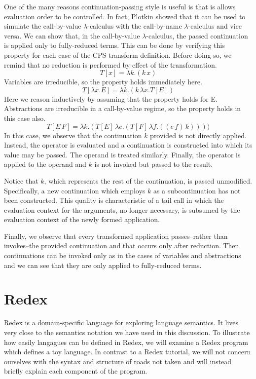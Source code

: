\documentclass[ms,electronic,twosidetoc,letterpaper,chaptercenter,parttop]{byumsphd}
\begin{document}
One of the many reasons continuation-passing style is useful is that is allows evaluation
order to be controlled. In fact, Plotkin \cite{plotkin1975call} showed that it can be used
to simulate the call-by-value $\lambda$-calculus with the call-by-name $\lambda$-calculus
and vice versa. We can show that, in the call-by-value $\lambda$-calculus, the passed
continuation is applied only to fully-reduced terms. This can be done by verifying this
property for each case of the CPS transform definition. Before doing so, we remind that no
reduction is performed by effect of the transformation.
\[
T[x]=\lambda k.(k\,x)
\]
Variables are irreducible, so the property holds immediately here.
\[
T[\lambda x.E]=\lambda k.(k\,\lambda x.T[E])
\]
Here we reason inductively by assuming that the property holds for E. Abstractions are
irreducible in a call-by-value regime, so the property holds in this case also.
\[
T[E\,F]=\lambda k.(T[E]\,\lambda e.(T[F]\,\lambda f.((e\,f)\,k))))
\]
In this case, we observe that the continuation $k$ provided is not directly applied.
Instead, the operator is evaluated and a continuation is constructed into which its value
may be passed. The operand is treated similarly. Finally, the operator is applied to the
operand and $k$ is not invoked but passed to the result.

Notice that $k$, which represents the rest of the continuation, is passed unmodified.
Specifically, a new continuation which employs $k$ as a subcontinuation has not been
constructed. This quality is characteristic of a tail call in which the evaluation context
for the arguments, no longer necessary, is subsumed by the evaluation context of the newly
formed application.

Finally, we observe that every transformed application passes--rather than invokes--the
provided continuation and that occurs only after reduction. Then continuations can be
invoked only as in the cases of variables and abstractions and we can see that they are 
only applied to fully-reduced terms.

\chapter{Redex}

Redex \cite{findler2010redex} is a domain-specific language for exploring language
semantics. It lives very close to the semantics notation we have used in this discussion.
To illustrate how easily langagues can be defined in Redex, we will examine a Redex
program which defines a toy language. In contrast to a Redex tutorial, we will not concern
ourselves with the syntax and structure of roads not taken and will instead briefly
explain each component of the program.
\end{document}

